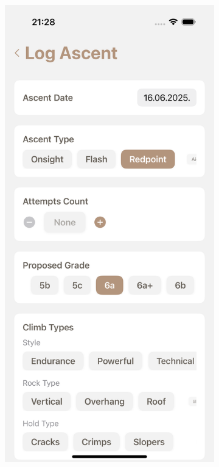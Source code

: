 \begin{figure}[H]
    \centering
    \begin{subfigure}[b]{0.38\textwidth}
        \centering
        \includegraphics[width=\textwidth]{images/implementacija/route-details/log-ascent.png}

\end{subfigure}
\end{figure}
